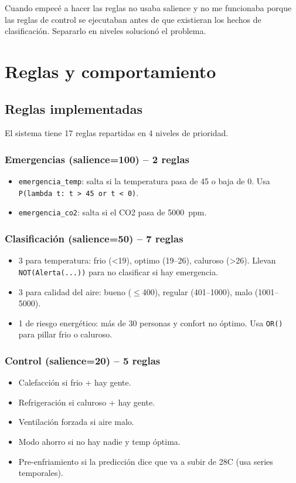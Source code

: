 \documentclass[12pt,a4paper]{article}
\begin{document}
Cuando empec\'e a hacer las reglas no usaba salience y no me funcionaba porque las reglas de control se ejecutaban antes de que existieran los hechos de clasificaci\'on. Separarlo en niveles solucion\'o el problema.

\newpage
\section{Reglas y comportamiento}

\subsection{Reglas implementadas}

El sistema tiene 17 reglas repartidas en 4 niveles de prioridad.

\subsubsection*{Emergencias (salience=100) -- 2 reglas}
\begin{itemize}
    \item \texttt{emergencia\_temp}: salta si la temperatura pasa de 45 o baja de 0. Usa \texttt{P(lambda t: t > 45 or t < 0)}.
    \item \texttt{emergencia\_co2}: salta si el CO2 pasa de 5000~ppm.
\end{itemize}

\subsubsection*{Clasificaci\'on (salience=50) -- 7 reglas}
\begin{itemize}
    \item 3 para temperatura: frio (<19), optimo (19--26), caluroso (>26). Llevan \texttt{NOT(Alerta(...))} para no clasificar si hay emergencia.
    \item 3 para calidad del aire: bueno ($\leq$400), regular (401--1000), malo (1001--5000).
    \item 1 de riesgo energ\'etico: m\'as de 30 personas y confort no \'optimo. Usa \texttt{OR()} para pillar frio o caluroso.
\end{itemize}

\subsubsection*{Control (salience=20) -- 5 reglas}
\begin{itemize}
    \item Calefacci\'on si frio + hay gente.
    \item Refrigeraci\'on si caluroso + hay gente.
    \item Ventilaci\'on forzada si aire malo.
    \item Modo ahorro si no hay nadie y temp \'optima.
    \item Pre-enfriamiento si la predicci\'on dice que va a subir de 28\textdegree C (usa series temporales).
\end{itemize}
\end{document}
